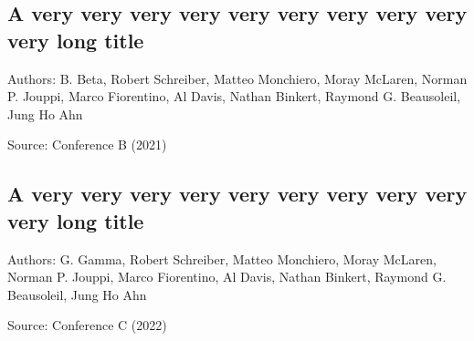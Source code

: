 \documentclass[\projectroot/template.tex]{subfiles}
\begin{document}
\blindtext

\subsection{A very very very very very very very very very very long title \texorpdfstring{\hyperref[tab:literature]{\footnotesize \hfill{}}}{}}
\label{lit:labelOfSubsubsection2}		%
\begin{hanglist}
	\item Authors: B. Beta, Robert Schreiber, Matteo Monchiero, Moray McLaren, Norman P. Jouppi, Marco Fiorentino, Al Davis, Nathan Binkert, Raymond G. Beausoleil, Jung Ho Ahn \cite{B}
	\item Source: Conference B (2021)
\end{hanglist}

\blindtext



\subsection{A very very very very very very very very very very long title \texorpdfstring{\hyperref[tab:literature]{\footnotesize \hfill{}}}{}}
\label{lit:labelOfSubsubsection3}		%
\begin{hanglist}
	\item Authors: G. Gamma, Robert Schreiber, Matteo Monchiero, Moray McLaren, Norman P. Jouppi, Marco Fiorentino, Al Davis, Nathan Binkert, Raymond G. Beausoleil, Jung Ho Ahn \cite{G}
	\item Source: Conference C (2022)
\end{hanglist}

\blindtext

\end{document}
